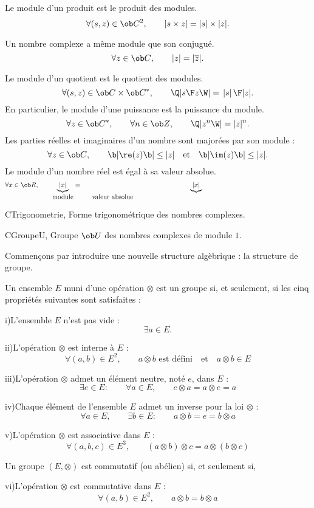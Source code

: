 \noindent
Le module d'un produit est le produit des modules. 
$$
{
\forall (s,z)\in\ob C^2}, \qquad{|s\times z|=|s|\times|z|}.
$$

\noindent
Un nombre complexe a m\^eme module que son conjugu\'e. 
$$
{\forall z\in\ob C}, \qquad
{|z|=|\overline z|}.
$$

\noindent
Le module d'un quotient est le quotient des modules. 
$$
{\forall (s,z)\in\ob C\times \ob C^*}, \qquad
{\Q|{s\F z}\W|={\thinspace|s|\thinspace\F|z|}}.
$$
En particulier, le module d'une puissance est la puissance du module. 
$$
{\forall z\in\ob C^*}, \qquad
{\forall n\in\ob Z}, \qquad 
{\Q|z^n\W|=|z|^n}.
$$
Les parties r\'eelles et imaginaires d'un nombre sont major\'ees par son module : 
$$
{
\forall z\in\ob C}, \qquad 
{\b|\re(z)\b|\le |z|}\quad\mbox{et}\quad
{\b|\im(z)\b|\le|z|}. 
$$
Le module d'un nombre r\'eel est \'egal \`a sa valeur absolue. 
$$
\forall x\in\ob R, \qquad \underbrace{|x|}_{\mbox{module}}=\underbrace{|x|}_{\vtop{\mbox{valeur absolue}}}
$$

\Section CTrigonometrie, Forme trigonom\'etrique des nombres complexes. 

\Subsection CGroupeU, Groupe $\ob U$ des nombres complexes de module $1$. 

Commen\c cons par introduire une nouvelle structure alg\`ebrique : la structure de groupe. 
\medskip


\Definition [] Un ensemble $E$ muni d'une op\'eration $\otimes$ est un groupe si, et seulement, si 
les cinq propri\'et\'es suivantes sont satisfaites : 
\item{i)}L'ensemble $E$ n'est pas vide : 
$$
\exists a\in E.
$$ 
\item{ii)}L'op\'eration $\otimes$ est interne \`a $E$ : 
$$
\forall (a,b)\in E^2, \qquad a\otimes b\mbox{ est d\'efini}\quad\mbox{et}\quad a\otimes b\in E
$$
\item{iii)}L'op\'eration $\otimes$ admet un \'el\'ement neutre, not\'e $e$, dans $E$ : 
$$
\exists e\in E:\qquad \forall a\in E,\qquad e\otimes a=a\otimes e=a
$$
\item{iv)}Chaque \'el\'ement de l'ensemble $E$ admet un inverse pour la loi $\otimes$ : 
$$
\forall a\in E, \qquad \exists b\in E:\qquad a\otimes b=e=b\otimes a
$$
\item{v)}L'op\'eration $\otimes$ est associative dans $E$ :
$$
\forall (a,b,c)\in E^3, \qquad(a\otimes b)\otimes c=a\otimes (b\otimes c)
$$ 

\Definition [] Un groupe $(E,\otimes)$ est commutatif (ou ab\'elien) si, et seulement si, 
\item{vi)}L'op\'eration $\otimes$ est commutative dans $E$ : 
$$
\forall (a,b)\in E^2, \qquad a\otimes b=b\otimes a
$$
\bigskip

